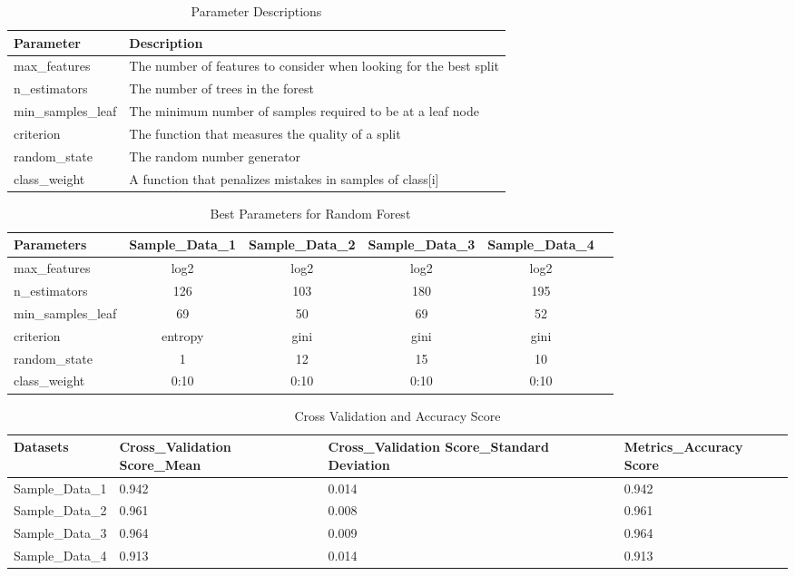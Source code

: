 \documentclass[a4paper, twoside, 12pt]{report}
\begin{document}
\begin{table}[h!]
	\begin{tabular}{ | l | p{13cm} |}
		\hline
		Parameter & Description  \\
		\hline
		max\_features & The number of features to consider when looking for the best split \\ 
		\hline
		n\_estimators & The number of trees in the forest \\ 
		\hline
		min\_samples\_leaf & The minimum number of samples required to be at a leaf node \\
		\hline
		criterion & The function that measures the quality of a split  \\
		\hline
		random\_state & The random number generator \\ 
		\hline
		class\_weight & A function that  penalizes mistakes in samples of class[i] \\ 
		\hline
	\end{tabular}
	\caption{Parameter Descriptions}
	\label{table:1}
\end{table}

\begin{table}[h!]
	\begin{tabular}{l*{4}{c}r}
		Parameters     & Sample\_Data\_1 & Sample\_Data\_2 & Sample\_Data\_3 & Sample\_Data\_4 \\
		\hline
		max\_features & log2 & log2 & log2 & log2  \\
		n\_estimators & 126 & 103 & 180 & 195  \\
		min\_samples\_leaf & 69 & 50 & 69 & 52  \\
		criterion & entropy & gini & gini & gini  \\
		random\_state & 1 & 12 & 15 & 10  \\
		class\_weight & {0:10} & {0:10} & {0:10} & {0:10}  \\
		
	\end{tabular}
	\caption{Best Parameters for Random Forest}
	\label{table:1}
\end{table}

\begin{table}[h!]
	\centering
	\begin{tabular}{ |p{3cm}||p{3cm}|p{3cm}|p{3cm}|  }
		
		\hline
		Datasets & Cross\_Validation
		Score\_Mean    & Cross\_Validation
		Score\_Standard Deviation
		& Metrics\_Accuracy
		Score\\
		\hline
		Sample\_Data\_1 & 0.942    &0.014 & 0.942\\
		\hline
		Sample\_Data\_2 & 0.961    &0.008 & 0.961\\
		\hline
		Sample\_Data\_3 & 0.964    &0.009 & 0.964\\
		\hline
		Sample\_Data\_4 & 0.913    &0.014 & 0.913\\
		\hline
	\end{tabular}
	\caption{Cross Validation and Accuracy Score}
	\label{table:1}
\end{table}
\end{document}
